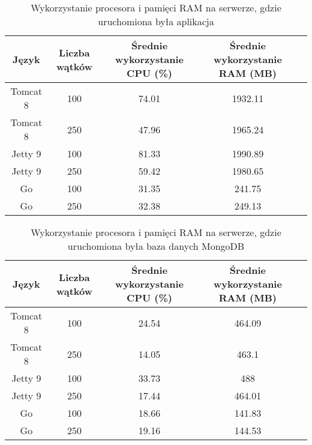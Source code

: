 
\begin{table}[!htb]
\centering
\caption{Wykorzystanie procesora i pamięci RAM na serwerze, gdzie uruchomiona była aplikacja}
\label{tab:app-full-api}
\begin{tabular}{@{}ccccl@{}}
\toprule
\textbf{Język} & \textbf{Liczba wątków} & \multicolumn{1}{p{3cm}}{\textbf{Średnie wykorzystanie CPU (\%)}} & \multicolumn{1}{p{3cm}}{\textbf{Średnie wykorzystanie RAM (MB)}} &  \\ \midrule
Tomcat 8       & 100                    & 74.01                             & 1932.11                          &  \\
Tomcat 8       & 250                    & 47.96                             & 1965.24                          &  \\
Jetty 9       & 100                    & 81.33                             & 1990.89                          &  \\
Jetty 9       & 250                    & 59.42                             & 1980.65                          &  \\
Go       & 100                    & 31.35                             & 241.75                          &  \\
Go       & 250                    & 32.38                             & 249.13                          &  \\
\bottomrule
\end{tabular}
\end{table}


\begin{table}[!htb]
\centering
\caption{Wykorzystanie procesora i pamięci RAM na serwerze, gdzie uruchomiona była baza danych MongoDB}
\label{tab:mongo-full-api}
\begin{tabular}{@{}ccccl@{}}
\toprule
\textbf{Język} & \textbf{Liczba wątków} & \multicolumn{1}{p{3cm}}{\textbf{Średnie wykorzystanie CPU (\%)}} & \multicolumn{1}{p{3cm}}{\textbf{Średnie wykorzystanie RAM (MB)}} &  \\ \midrule
Tomcat 8       & 100                    & 24.54                             & 464.09                          &  \\
Tomcat 8       & 250                    & 14.05                             & 463.1                          &  \\
Jetty 9       & 100                    & 33.73                             & 488                          &  \\
Jetty 9       & 250                    & 17.44                             & 464.01                          &  \\
Go       & 100                    & 18.66                             & 141.83                          &  \\
Go       & 250                    & 19.16                             & 144.53                          &  \\
\bottomrule
\end{tabular}
\end{table}

